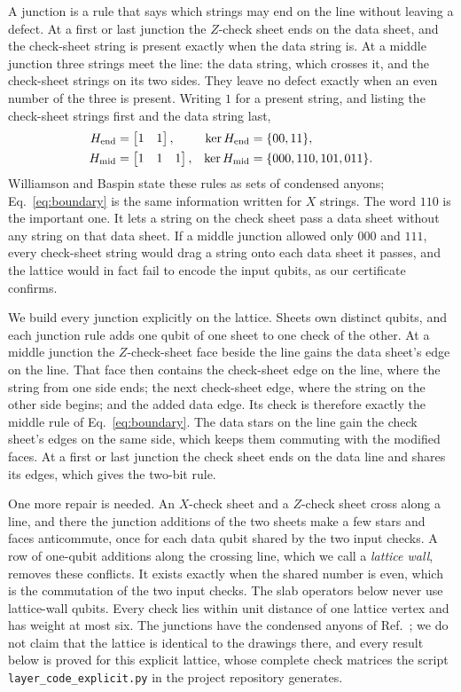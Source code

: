 \documentclass[10pt,a4paper,twocolumn]{article}
\begin{document}
A junction is a rule that says which strings may end on the line without leaving
a defect.  At a first or last junction the $Z$-check sheet ends on the data
sheet, and the check-sheet string is present exactly when the data string is.
At a middle junction three strings meet the line: the data string, which
crosses it, and the check-sheet strings on its two sides.  They leave no defect
exactly when an even number of the three is present.  Writing $1$ for a present
string, and listing the check-sheet strings first and the data string last,
\begin{align}
 H_{\rm end}&=\begin{bmatrix}1&1\end{bmatrix}, &
 \ker H_{\rm end}&=\{00,11\},\nonumber\\
 H_{\rm mid}&=\begin{bmatrix}1&1&1\end{bmatrix}, &
 \ker H_{\rm mid}&=\{000,110,101,011\}.
 \label{eq:boundary}
\end{align}
Williamson and Baspin state these rules as sets of condensed anyons;
Eq.~\eqref{eq:boundary} is the same information written for $X$ strings.  The
word $110$ is the important one.  It lets a string on the check sheet pass a
data sheet without any string on that data sheet.  If a middle junction allowed
only $000$ and $111$, every check-sheet string would drag a string onto each
data sheet it passes, and the lattice would in fact fail to encode the input
qubits, as our certificate confirms.

We build every junction explicitly on the lattice.  Sheets own distinct qubits,
and each junction rule adds one qubit of one sheet to one check of the other.
At a middle junction the $Z$-check-sheet face beside the line gains the data
sheet's edge on the line.  That face then contains the check-sheet edge on the
line, where the string from one side ends; the next check-sheet edge, where the
string on the other side begins; and the added data edge.  Its check is
therefore exactly the middle rule of Eq.~\eqref{eq:boundary}.  The data stars on
the line gain the check sheet's edges on the same side, which keeps them
commuting with the modified faces.  At a first or last junction the check sheet
ends on the data line and shares its edges, which gives the two-bit rule.

One more repair is needed.  An $X$-check sheet and a $Z$-check sheet cross along
a line, and there the junction additions of the two sheets make a few stars and
faces anticommute, once for each data qubit shared by the two input checks.  A
row of one-qubit additions along the crossing line, which we call a
\emph{lattice wall}, removes these conflicts.  It exists exactly when the shared
number is even, which is the commutation of the two input checks.  The slab
operators below never use lattice-wall qubits.  Every check lies within unit
distance of one lattice vertex and has weight at most six.  The junctions have
the condensed anyons of Ref.~\cite{WilliamsonBaspinLayerCodes}; we do not claim
that the lattice is identical to the drawings there, and every result below is
proved for this explicit lattice, whose complete check matrices the script
\texttt{layer\_code\_explicit.py} in the project repository \cite{Repo}
generates.
\end{document}
